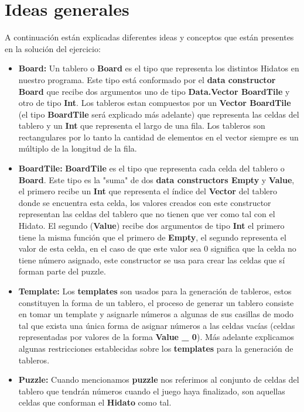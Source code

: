 \documentclass[12pt]{article}
\begin{document}
\section{Ideas generales}
A continuaci\'on est\'an explicadas diferentes ideas y conceptos que est\'an presentes
en la soluci\'on del ejercicio:
\begin{itemize}
	\item {\bf Board:}\newline
		Un tablero o {\bf Board} es el tipo que representa los distintos Hidatos en nuestro programa. Este tipo est\'a conformado
		por el {\bf data constructor Board} que recibe dos argumentos uno de tipo {\bf Data.Vector BoardTile} y otro de tipo {\bf Int}.
		Los tableros estan compuestos por un {\bf Vector BoardTile} (el tipo {\bf BoardTile} ser\'a explicado m\'as adelante) que representa
		las celdas del tablero y un {\bf Int} que representa el largo de una fila. Los tableros son rectangulares por lo tanto la cantidad de
		elementos en el vector siempre es un m\'ultiplo de la longitud de la fila.
	\item {\bf BoardTile:}\newline
		{\bf BoardTile} es el tipo que representa cada celda del tablero o {\bf Board}. Este tipo es la "suma" de dos {\bf data constructors Empty} y {\bf Value},
		el primero recibe un {\bf Int} que representa el \'indice del {\bf Vector} del tablero donde se encuentra esta celda, los valores creados con este constructor
		representan las celdas del tablero que no tienen que ver como tal con el Hidato. El segundo ({\bf Value}) recibe dos argumentos de tipo {\bf Int} el primero tiene
		la misma funci\'on que el primero de {\bf Empty}, el segundo representa el valor de esta celda, en el caso de que este valor sea 0 significa que la celda no tiene n\'umero
		asignado, este constructor se usa para crear las celdas que s\'i forman parte del puzzle.
	\item {\bf Template:}\newline
		Los {\bf templates} son usados para la generaci\'on de tableros, estos constituyen la forma de un tablero, el proceso de generar un tablero consiste en tomar un template y asignarle
		n\'umeros a algunas de sus casillas de modo tal que exista una \'unica forma de asignar n\'umeros a las celdas vac\'ias (celdas representadas por valores de la forma {\bf Value \_ 0}). M\'as adelante explicamos
		algunas restricciones establecidas sobre los {\bf templates} para la generaci\'on de tableros.
	\item {\bf Puzzle:}\newline
		Cuando mencionamos {\bf puzzle} nos referimos al conjunto de celdas del tablero que tendr\'an n\'umeros cuando el juego haya finalizado, son aquellas celdas que conforman el {\bf Hidato} como tal.	
\end{itemize}
\end{document}
